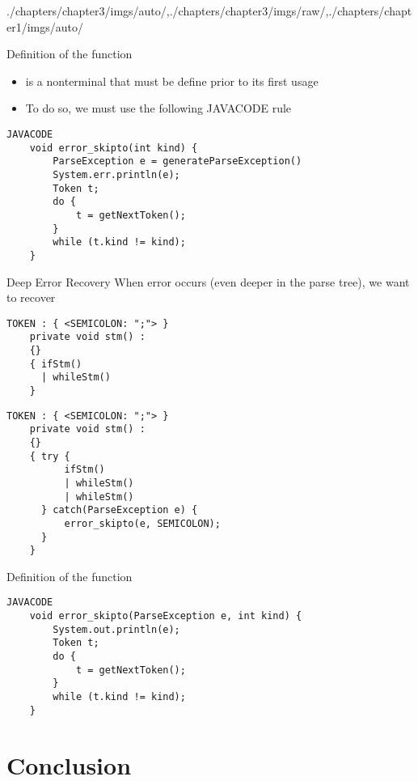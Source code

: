 \begin{graphicspathcontext}{{./chapters/chapter3/imgs/auto/},{./chapters/chapter3/imgs/raw/},{./chapters/chapter1/imgs/auto/}}
\begin{bibunit}[apalike]
\begin{frame}[fragile]{Definition of the function }
	\begin{itemize}
	\item {} is a nonterminal that must be define prior to its first usage
	\item To do so, we must use the following JAVACODE rule
	\end{itemize}
	\begin{lstlisting}[style=lststyle-java]
	JAVACODE
	void error_skipto(int kind) {
	    ParseException e = generateParseException()
	    System.err.println(e);
	    Token t;
	    do {
	        t = getNextToken();
	    }
	    while (t.kind != kind);
	}
	\end{lstlisting}
\end{frame}

\begin{frame}[t,fragile]{Deep Error Recovery}
	When error occurs (even deeper in the parse tree), we want to recover \\
	\begin{lstlisting}[style=lststyle-java]
	TOKEN : { <SEMICOLON: ";"> }
	private void stm() :
	{}
	{ ifStm()
	  | whileStm()
	}
	\end{lstlisting}
	\mbox{}\hfill{}\hfill\mbox{}
	\begin{lstlisting}[style=lststyle-java]
	TOKEN : { <SEMICOLON: ";"> }
	private void stm() :
	{}
	{ try {
	      ifStm()
	      | whileStm()
	      | whileStm()
	  } catch(ParseException e) {
	      error_skipto(e, SEMICOLON);
	  }
	}
	\end{lstlisting}
\end{frame}

\begin{frame}[fragile]{Definition of the function }
	\begin{lstlisting}[style=lststyle-java]
	JAVACODE
	void error_skipto(ParseException e, int kind) {
	    System.out.println(e);
	    Token t;
	    do {
	        t = getNextToken();
	    }
	    while (t.kind != kind);
	}
	\end{lstlisting}
\end{frame}

\section{Conclusion}
\sectiontableofcontentslide


\end{bibunit}
\end{graphicspathcontext}
